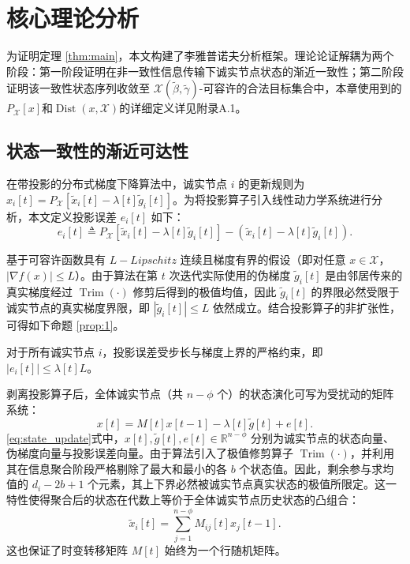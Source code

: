 \chapter{核心理论分析}

为证明定理 \ref{thm:main}，本文构建了李雅普诺夫分析框架。理论论证解耦为两个阶段：第一阶段证明在非一致性信息传输下诚实节点状态的渐近一致性；第二阶段证明该一致性状态序列收敛至 $\mathcal{X}(\tilde{\beta}, \tilde{\gamma})$-可容许的合法目标集合中，本章使用到的$P_{\mathcal{X}}[x]$和$\operatorname{Dist}(x,\mathcal{X})$的详细定义详见附录A.1。

\section{状态一致性的渐近可达性}

在带投影的分布式梯度下降算法中，诚实节点 $i$ 的更新规则为 $x_i[t] = P_{\mathcal{X}} [\tilde{x}_i[t] - \lambda[t]\tilde{g}_i[t]]$。为将投影算子引入线性动力学系统进行分析，本文定义投影误差 $e_i[t]$ 如下：
\begin{equation} \label{eq:proj_err}
    e_i[t] \triangleq P_{\mathcal{X}} [\tilde{x}_i[t] - \lambda[t]\tilde{g}_i[t]] - (\tilde{x}_i[t] - \lambda[t]\tilde{g}_i[t]).
\end{equation}

基于可容许函数具有 $L-Lipschitz$ 连续且梯度有界的假设（即对任意 $x \in \mathcal{X}$，$|\nabla f(x)| \le L$）。由于算法在第 $t$ 次迭代实际使用的伪梯度 $\tilde{g}_i[t]$ 是由邻居传来的真实梯度经过 $\operatorname{Trim}(\cdot)$ 修剪后得到的极值均值，因此 $\tilde{g}_i[t]$ 的界限必然受限于诚实节点的真实梯度界限，即 $|\tilde{g}_i[t]| \le L$ 依然成立。结合投影算子的非扩张性，可得如下命题 \ref{prop:1}。

\begin{proposition}\label{prop:1}
    对于所有诚实节点 $i$，投影误差受步长与梯度上界的严格约束，即 $|e_i[t]| \le \lambda[t]L$。
\end{proposition}

剥离投影算子后，全体诚实节点（共 $n-\phi$ 个）的状态演化可写为受扰动的矩阵系统：
\begin{equation}
    \label{eq:state_update}
    x[t] = M[t]x[t-1] - \lambda[t]\tilde{g}[t] + e[t].
\end{equation}
\eqref{eq:state_update}式中，$x[t], \tilde{g}[t], e[t] \in \mathbb{R}^{n-\phi}$ 分别为诚实节点的状态向量、伪梯度向量与投影误差向量。由于算法引入了极值修剪算子 $\operatorname{Trim}(\cdot)$，并利用其在信息聚合阶段严格剔除了最大和最小的各 $b$ 个状态值。因此，剩余参与求均值的 $d_i - 2b + 1$ 个元素，其上下界必然被诚实节点真实状态的极值所限定。这一特性使得聚合后的状态在代数上等价于全体诚实节点历史状态的凸组合：
\begin{equation} \label{eq:convex_comb}
    \tilde{x}_i[t] = \sum_{j=1}^{n-\phi} M_{ij}[t]x_j[t-1].
\end{equation}
这也保证了时变转移矩阵 $M[t]$ 始终为一个行随机矩阵。

